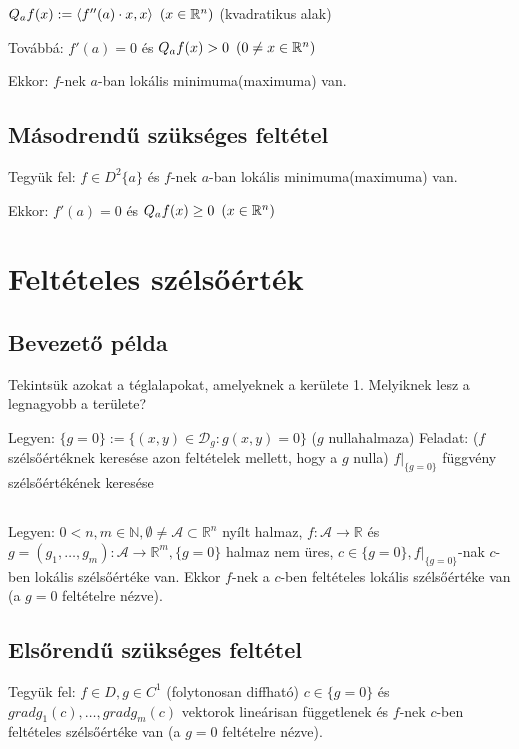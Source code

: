 \documentclass[a4paper,11.5pt]{article}
\begin{document}
    $Q_a f(x):=\langle f''(a)\cdot x,x\rangle\enskip(x\in\mathbb{R}^{n})$ (kvadratikus alak)

    Továbbá: $f'(a)=0$ és $Q_a f(x)>0\enskip (0\neq x\in\mathbb{R}^{n})$

    Ekkor: $f$-nek $a$-ban lokális minimuma(maximuma) van.
    \subsection{Másodrendű szükséges feltétel}
    Tegyük fel: $f\in D^2\{a\}$ és $f$-nek $a$-ban lokális minimuma(maximuma) van.

    Ekkor: $f'(a)=0$ és $Q_a f(x)\geq 0\enskip (x\in\mathbb{R}^{n})$

\section{Feltételes szélsőérték}
\subsection{Bevezető példa}
    Tekintsük azokat a téglalapokat, amelyeknek a kerülete 1. Melyiknek lesz a legnagyobb a területe?


    Legyen: $\{g=0\}:=\{(x,y)\in\mathcal{D}_{g}:g(x,y)=0\}$ ($g$ nullahalmaza)
    Feladat: ($f$ szélsőértéknek keresése azon feltételek mellett, hogy a $g$ nulla) $f|_{\{g=0\}}$ függvény szélsőértékének keresése
\subsection{}
Legyen: $0<n,m\in\mathbb{N},\emptyset\neq\mathcal{A}\subset\mathbb{R}^{n}$ nyílt halmaz, $f:\mathcal{A}\rightarrow\mathbb{R}$ és $g=(g_1 ,\ldots ,g_m ):\mathcal{A}\rightarrow\mathbb{R}^{m}, \{g=0\}$ halmaz nem üres, $c\in\{g=0\}, f|_{\{g=0\}}$-nak $c$-ben lokális szélsőértéke van.
Ekkor $f$-nek a $c$-ben feltételes lokális szélsőértéke van (a $g=0$ feltételre nézve).
\subsection{Elsőrendű szükséges feltétel}
Tegyük fel: $f\in D, g\in C^1$ (folytonosan diffható)
$c\in\{g=0\}$ és $grad g_1 (c),\ldots ,grad g_m (c)$ vektorok lineárisan függetlenek és $f$-nek $c$-ben feltételes szélsőértéke van (a $g=0$ feltételre nézve).
\end{document}
